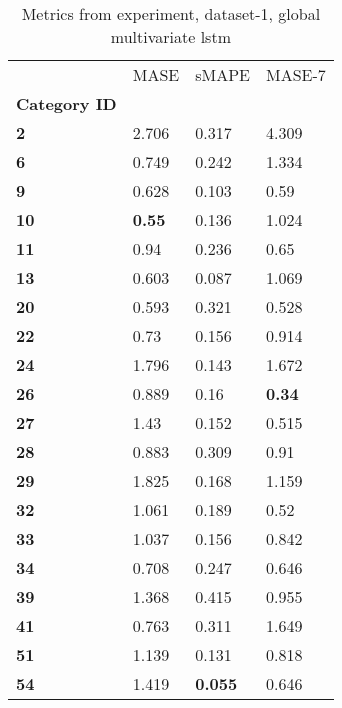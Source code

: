 \begin{table}[H]
\centering
\caption{Metrics from experiment, dataset-1, global multivariate lstm}
\label{table:global-multivariate-lstm-dataset-1}
\begin{tabular}{llll}
\toprule
{} &           MASE &           sMAPE &         MASE-7 \\
\textbf{Category ID} &                &                 &                \\
\midrule
\textbf{2          } &          2.706 &           0.317 &          4.309 \\
\textbf{6          } &          0.749 &           0.242 &          1.334 \\
\textbf{9          } &          0.628 &           0.103 &           0.59 \\
\textbf{10         } &  \textbf{0.55} &           0.136 &          1.024 \\
\textbf{11         } &           0.94 &           0.236 &           0.65 \\
\textbf{13         } &          0.603 &           0.087 &          1.069 \\
\textbf{20         } &          0.593 &           0.321 &          0.528 \\
\textbf{22         } &           0.73 &           0.156 &          0.914 \\
\textbf{24         } &          1.796 &           0.143 &          1.672 \\
\textbf{26         } &          0.889 &            0.16 &  \textbf{0.34} \\
\textbf{27         } &           1.43 &           0.152 &          0.515 \\
\textbf{28         } &          0.883 &           0.309 &           0.91 \\
\textbf{29         } &          1.825 &           0.168 &          1.159 \\
\textbf{32         } &          1.061 &           0.189 &           0.52 \\
\textbf{33         } &          1.037 &           0.156 &          0.842 \\
\textbf{34         } &          0.708 &           0.247 &          0.646 \\
\textbf{39         } &          1.368 &           0.415 &          0.955 \\
\textbf{41         } &          0.763 &           0.311 &          1.649 \\
\textbf{51         } &          1.139 &           0.131 &          0.818 \\
\textbf{54         } &          1.419 &  \textbf{0.055} &          0.646 \\
\bottomrule
\end{tabular}
\end{table}
